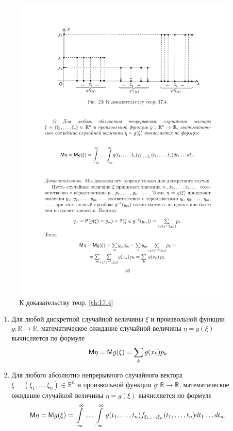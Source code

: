 \begin{figure}[H]
	\centering
	\includegraphics[]{pic/pic23}
	\caption{К доказательству теор. \ref{th:17.4}}
	\label{fig23}
\end{figure}
\begin{theorem}
\label{th:17.4}
\begin{enumerate}
	\item Для любой дискретной случайной величины $\xi$ и произвольной функции $g : \mathbb{R} \to \mathbb{R}$, математическое ожидание случайной величины $\eta = g(\xi)$ вычисляется по формуле
		\begin{equation*}
			\mathsf{M}\eta=\mathsf{M} g(\xi)=\sum_k g(x_k)p_k
		\end{equation*}
	\item Для любого абсолютно непрерывного случайного вектора
	$\xi = (\xi_1, \dots, \xi_n) \in \mathbb{R}^n$ и произвольной функции 
	$g : \mathbb{R} \to \mathbb{R}$, математическое ожидание случайной величины 
	$\eta = g(\xi)$ вычисляется по формуле
		\begin{equation*}
			\mathsf{M}\eta=\mathsf{M} g(\xi)=\int\limits_{-\infty}^{\infty}\ldots
			\int\limits_{-\infty}^{\infty}g(t_1,\ldots,t_n)f_{\xi_1,\ldots,\xi_n}(t_1,\ldots,t_n)dt_1\dots dt_n.
		\end{equation*}
\end{enumerate}

\end{theorem}

